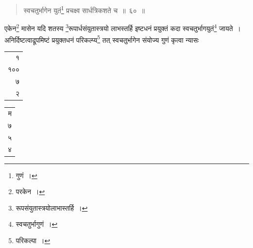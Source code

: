 \documentclass[10pt, openany]{book}
\begin{document}
{{{{\vspace{0.3cm}{उदाहरणम्\textemdash}

\begin{quote}
    
{\eg  स्वचतुर्भागेन युतं\renewcommand{\thefootnote}{\s १२}\footnote{\s गुणं~।}  प्रचक्ष्व सार्धत्रिकशते च~॥~६०~॥}\end{quote}

{एकेन\renewcommand{\thefootnote}{\s १३}\footnote{\s परकेन~।}  मासेन यदि शतस्य \renewcommand{\thefootnote}{\s १४}\footnote{\s रूपसंयुतास्त्रयोलाभास्तर्हि~।}रूपार्धसंयुतास्त्रयो लाभस्तर्हि
इष्टधनं प्रयुक्तं कदा}
{स्वचतुर्भागयुतं\renewcommand{\thefootnote}{\s १५}\footnote{\s स्वचतुर्भागुणं~।}  जायते~। अनिर्दिष्टत्वाद्रूपमिष्टं प्रयुक्तधनं
परिकल्प्य\renewcommand{\thefootnote}{\s १६}\footnote{\s परिकल्पा~।}  तत् स्वचतुर्भागेन संयोज्य गुणं कृत्वा न्यासः\textemdash} \begin{tabular}{r|}१ \\१०० \\७ \\२ \end{tabular}\begin{tabular}{r} म \\ ७ \\ ५\\ ४ \end{tabular}

}}}}
\end{document}

